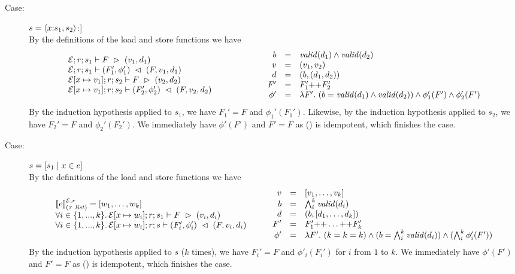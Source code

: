 {\begin{description}
\item[Case:]$s = \SPair{x}{s_1}{s_2}$:]\\[1ex]
%
By the definitions of the load and store functions we have 
\[ 
\begin{array}{l}
\load{\Env}{F}{r}{s_1}{v_1,d_1}\\
\store{\Env}{F}{r}{v_1,d_1}{s_1}{F_1',\phi_1'}\\
\load{\Env[x \mapsto v_1]}{F}{r}{s_2}{v_2,d_2}\\
\store{\Env[x \mapsto v_1]}{F}{r}{v_2,d_2}{s_2}{F_2',\phi_2'}\\
\end{array} \hspace*{2cm}
\begin{array}{rcl}
b &= & \valid{d_1} \wedge \valid{d_2}\\
v &=& (v_1,v_2)\\
d &=& (b,(d_1,d_2))\\
F' &=& F_1' \FAppend F_2'\\
\phi' &=& \lambda F'.~(b = \valid{d_1} \wedge \valid{d_2}) \wedge \phi_1'(F') \wedge \phi_2'(F')\\
\end{array}
\]
By the induction hypothesis applied to $s_1$, we have $F_1' = F$ and
$\phi_1'(F_1')$. Likewise, by the induction hypothesis applied to
$s_2$, we have $F_2' = F$ and $\phi_2'(F_2')$. We immediately have
$\phi'(F')$ and $F' = F$ as (\FAppend) is idempotent, which finishes
the case.

\item[Case:] $s = \SComp{s_1}{x}{e}$\\[1ex]
%
By the definitions of the load and store functions we have 
\[ 
\begin{array}{l}
\eval{e}{\Env,r}{(\tau\ \mathit{list})} = [w_1,\dots,w_k ]\\
\forall i \in \{1,...,k\}.\,\load{\Env[ x \mapsto w_i]}{F}{r}{s_1}{v_i,d_i}\\
\forall i \in \{1,...,k\}.\,\store{\Env[x \mapsto w_i]}{F}{r}{v_i,d_i}{s}{F_i',\phi_i'}\\
\end{array}\hspace*{.75cm}\begin{array}{rcl}
v &=& [v_1,\dots,v_k]\\
b &= &\bigwedge_i^k \valid{d_i}\\
d &=& (b,[d_1,\dots,d_k])\\
F' &=& F_1' \FAppend \dots \FAppend F_k'\\
\phi' &=& \lambda F'.~(k = k = k) \wedge (b = \bigwedge_i^k \valid{d_i}) \wedge (\bigwedge_i^k \phi_i'(F'))\\
\end{array}
\]
By the induction hypothesis applied to $s$ ($k$ times), we have $F_i'
= F$ and $\phi'_i(F_i')$ for $i$ from $1$ to $k$. We immediately have
$\phi'(F')$ and $F' = F$ as (\FAppend) is idempotent, which finishes
the case.


\end{description}}
